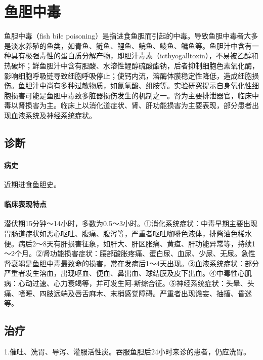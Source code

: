 \protect\hypertarget{text00177.html}{}{}

\section{鱼胆中毒}

鱼胆中毒（fish bile
poisoning）是指进食鱼胆而引起的中毒。导致鱼胆中毒者大多是淡水养殖的鱼类，如青鱼、鲢鱼、鲤鱼、鲩鱼、鲮鱼、鳙鱼等。鱼胆汁中含有一种具有极强毒性的蛋白质分解产物，即胆汁毒素（icthyogalltoxin），不易被乙醇和热破坏；鲜鱼胆汁中含有胆酸、水溶性鲤醇硫酸酯钠，后者抑制细胞色素氧化酶，影响细胞呼吸链导致细胞呼吸停止；使钙内流，溶酶体膜稳定性降低，造成细胞损伤。鱼胆汁中尚有多种过敏物质，如氰氢酸、组胺等。实验研究提示自身氧化性细胞损害可能是鱼胆中毒致多脏器损伤发生的机制之一。肾为主要排泄器官，临床中毒以肾损害为主。临床上以消化道症状、肾、肝功能损害为主要表现，部分患者出现血液系统及神经系统症状。

\subsection{诊断}

\paragraph{病史}

近期进食鱼胆史。

\paragraph{临床表现特点}

潜伏期15分钟～14小时，多数为0.5～3小时。①消化系统症状：中毒早期主要出现胃肠道症状如恶心呕吐、腹痛、腹泻等，严重者呕吐咖啡色液体，排酱油色稀水便。病后2～8天有肝损害征象，如肝大、肝区胀痛、黄疸、肝功能异常等，持续1～2个月。②肾功能损害症状：腰部酸胀疼痛、蛋白尿、血尿、少尿、无尿。急性肾衰竭是鱼胆中毒最致命的损害，常在发病后1～4天出现。③血液系统症状：部分严重者发生溶血，出现呕血、便血、鼻出血、球结膜及皮下出血。④中毒性心肌病：心动过速、心力衰竭等，并可发生阿-斯综合征。⑤神经系统症状：头晕、头痛、嗜睡、四肢远端及唇舌麻木、末梢感觉障碍。严重者出现谵妄、抽搐、昏迷等。

\subsection{治疗}

1.催吐、洗胃、导泻、灌服活性炭。吞服鱼胆后24小时来诊的患者，仍应洗胃。

